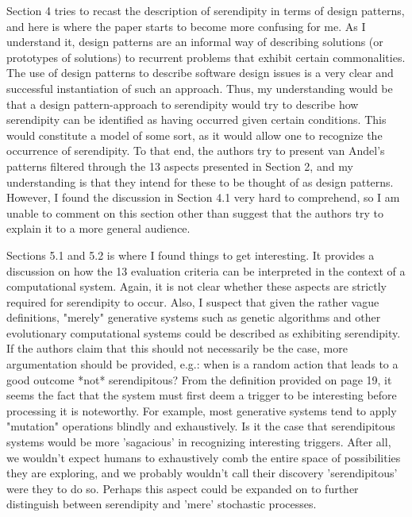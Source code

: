 Section 4 tries to recast the description of serendipity in terms of design patterns, and here is
where the paper starts to become more confusing for me. As I understand it, design patterns
are an informal way of describing solutions (or prototypes of solutions) to recurrent problems
that exhibit certain commonalities. The use of design patterns to describe software design
issues is a very clear and successful instantiation of such an approach. Thus, my understanding
would be that a design pattern-approach to serendipity would try to describe how serendipity
can be identified as having occurred given certain conditions. This would constitute a model of
some sort, as it would allow one to recognize the occurrence of serendipity. To that end, the
authors try to present van Andel's patterns filtered through the 13 aspects presented in Section
2, and my understanding is that they intend for these to be thought of as design patterns.
However, I found the discussion in Section 4.1 very hard to comprehend, so I am unable to
comment on this section other than suggest that the authors try to explain it to a more general
audience.

Sections 5.1 and 5.2 is where I found things to get interesting. It provides a discussion on how
the 13 evaluation criteria can be interpreted in the context of a computational system. Again, it is
not clear whether these aspects are strictly required for serendipity to occur. Also, I suspect that
given the rather vague definitions, "merely" generative systems such as genetic algorithms and
other evolutionary computational systems could be described as exhibiting serendipity. If the
authors claim that this should not necessarily be the case, more argumentation should be
provided, e.g.: when is a random action that leads to a good outcome *not* serendipitous?
From the definition provided on page 19, it seems the fact that the system must first deem a
trigger to be interesting before processing it is noteworthy. For example, most generative
systems tend to apply "mutation" operations blindly and exhaustively. Is it the case that
serendipitous systems would be more 'sagacious' in recognizing interesting triggers. After all,
we wouldn't expect humans to exhaustively comb the entire space of possibilities they are
exploring, and we probably wouldn't call their discovery 'serendipitous' were they to do so.
Perhaps this aspect could be expanded on to further distinguish between serendipity and 'mere'
stochastic processes.

